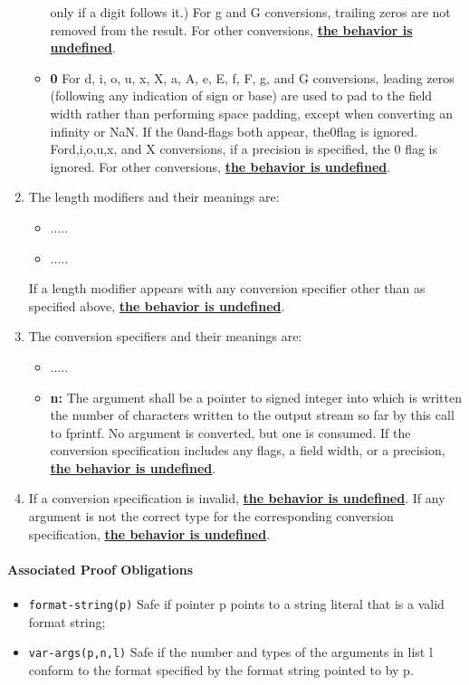 \documentclass[11pt]{article}
\begin{document}
\begin{enumerate}
\begin{itemize}
only if a digit follows it.) For g and G conversions, trailing zeros are not 
removed from the result. For other conversions, 
\underline{\bf the behavior is undefined}.
\item  {\bf 0} For d, i, o, u, x, X, a, A, e, E, f, F, g, and G conversions, 
leading zeros (following any indication of sign or base) are used to pad to 
the field width rather than performing space padding, except when converting 
an infinity or NaN. If the 0and-flags both appear, the0flag is ignored. 
Ford,i,o,u,x, and X conversions, if a precision is specified, 
the 0 flag is ignored. For other conversions, 
\underline{\bf the behavior is undefined}.
\end{itemize}
\item  The length modifiers and their meanings are:
\begin{itemize}
\item .....
\item .....
\end{itemize}
If a length modifier appears with any conversion specifier other than as specified above, 
\underline{\bf the behavior is undefined}.
\item The conversion specifiers and their meanings are:
\begin{itemize}
\item  .....
\item {\bf n: } The argument shall be a pointer to signed integer into which 
is written the number of characters written to the output stream so far by this 
call to fprintf. No argument is converted, but one is consumed. If the conversion 
specification includes any flags, a field width, or a precision, 
\underline{\bf the behavior is undefined}.
\end{itemize}
\item If a conversion specification is invalid, 
\underline{\bf the behavior is undefined}. 
If any argument is not the correct type for the corresponding conversion 
specification, \underline{\bf the behavior is undefined}.
\end{enumerate}

\paragraph{Associated Proof Obligations} 
\begin{itemize}
\item {\tt format-string(p)} Safe if pointer p points to a string literal that is a valid format string;
\item {\tt var-args(p,n,l)} Safe if the number and types of the arguments in list l conform to the
   format specified by the format string pointed to by p.
\end{itemize}
\end{document}

